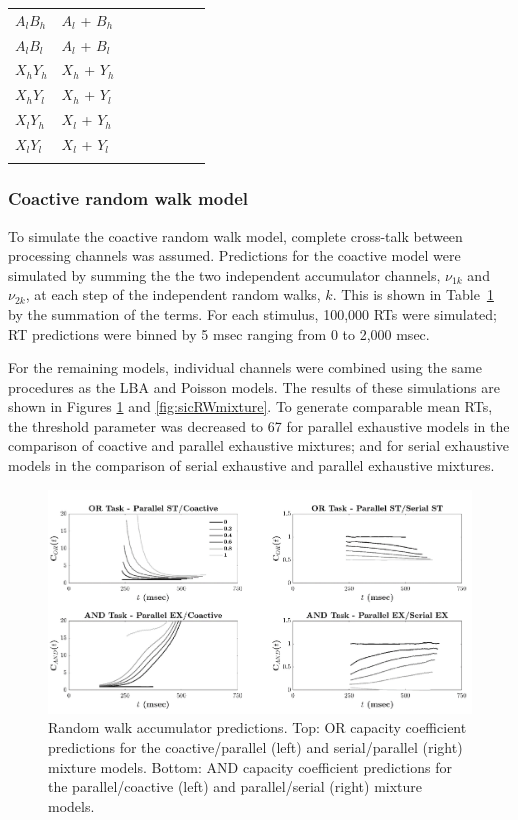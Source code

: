 \begin{table}[tbh]
\begin{tabular}{l l c l c c }
$A_lB_h$ &  $A_l$ + $B_h$  & ~ &   ~        & ~           & ~           \\
$A_lB_l$ &  $A_l$ + $B_l$  & ~ &   ~        & ~           & ~           \\
$X_hY_h$ &  $X_h$ + $Y_h$  & ~ &   ~        & ~           & ~           \\
$X_hY_l$ &  $X_h$ + $Y_l$  & ~ &   ~        & ~           & ~           \\
$X_lY_h$ &  $X_l$ + $Y_h$  & ~ &   ~        & ~           & ~           \\
$X_lY_l$ &  $X_l$ + $Y_l$  & ~ &   ~        & ~           & ~           \\
\hline
\hline
\label{tab:RW_drifts}
\end{tabular} 
\end{table}

\subsubsection {Coactive random walk model} To simulate the coactive random walk model, complete cross-talk between processing channels was assumed. Predictions for the coactive model were simulated by summing the the two independent accumulator channels, $\nu_{1k}$ and $\nu_{2k}$, at each step of the independent random walks, $k$. This is shown in Table~\ref{tab:RW_drifts} by the summation of the terms. For each stimulus, 100,000 RTs were simulated; RT predictions were binned by 5 msec ranging from 0 to 2,000 msec.

For the remaining models, individual channels were combined using the same procedures as the LBA and Poisson models. The results of these simulations are shown in Figures \ref{fig:capRWmixture} and \ref{fig:sicRWmixture}. To generate comparable mean RTs, the threshold parameter was decreased to 67 for parallel exhaustive models in the comparison of coactive and parallel exhaustive mixtures; and for serial exhaustive models in the comparison of serial exhaustive and parallel exhaustive mixtures.

\begin{figure}
\centering
\includegraphics[scale=.6]{Figures/Mix/Figure_C1.pdf}
\caption{Random walk accumulator predictions. Top: OR capacity coefficient predictions for the coactive/parallel (left) and serial/parallel (right) mixture models. Bottom: AND capacity coefficient predictions for the parallel/coactive (left) and parallel/serial (right) mixture models.}
\label{fig:capRWmixture}
\end{figure}

